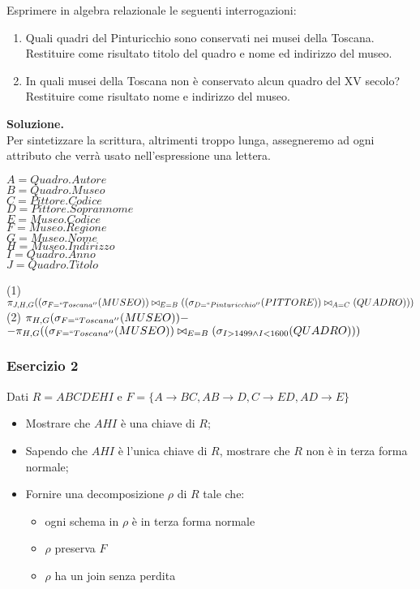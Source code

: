  Esprimere in algebra relazionale le seguenti interrogazioni:
  \begin{enumerate}
   \item Quali quadri del Pinturicchio sono conservati nei musei della Toscana. Restituire come risultato titolo del quadro e 
   nome ed indirizzo del museo.
   \item In quali musei della Toscana non è conservato alcun quadro del XV secolo? Restituire come risultato nome e indirizzo del museo.   
  \end{enumerate}
  \noindent\textbf{\fontsize{14pt}{1em}Soluzione.}\\
  Per sintetizzare la scrittura, altrimenti troppo lunga, assegneremo ad ogni attributo che verrà usato
  nell'espressione una lettera.
  
  \begin{multicols}{3}
  \begin{flushleft}
   $A =Quadro.Autore$\\
   $B = Quadro.Museo$\\
   $C = Pittore.Codice$\\
   $D = Pittore.Soprannome$\\
   $E = Museo.Codice$\\
   $F = Museo.Regione$\\
   $G = Museo.Nome$\\
   $H = Museo.Indirizzo$\\
   $I = Quadro.Anno$\\
   $J = Quadro.Titolo$\\
  \end{flushleft}
  \end{multicols}

 \noindent(1) $\pi_{J, H, G}((\sigma_{F=``Toscana''}(MUSEO))\bowtie_{E=B}((\sigma_{D=``Pinturicchio''}(PITTORE))\bowtie_{A=C}(QUADRO)))$\\
 (2) $\pi_{H, G}(\sigma_{F=``Toscana''}(MUSEO)) -$\\
 $- \pi_{H, G}((\sigma_{F=``Toscana''}(MUSEO))\bowtie_{E=B}(\sigma_{I > 1499 \wedge I < 1600}(QUADRO)))$\\

  \subsubsection{Esercizio 2}
 Dati $R=ABCDEHI$ e $F=\{A\rightarrow BC, AB\rightarrow D, C\rightarrow ED, AD\rightarrow E\}$
 \begin{itemize}
  \item Mostrare che $AHI$ è una chiave di $R$;
  \item Sapendo che $AHI$ è l'unica  chiave di $R$, mostrare che $R$ non è in terza forma normale;
  \item Fornire una decomposizione $\rho$ di $R$ tale che:
   \begin{itemize}   
     \item ogni schema in $\rho$ è in terza forma normale
    \item $\rho$ preserva $F$
    \item $\rho$ ha un join senza perdita
    \end{itemize}
 \end{itemize}
 
